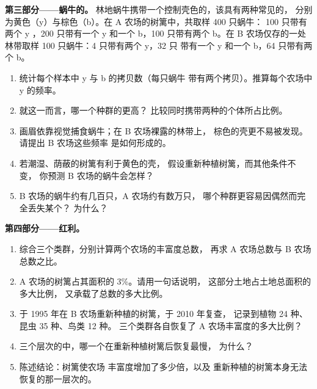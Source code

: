 \begin{problem}
\medskip
\noindent\textbf{第三部分——蜗牛的。}
林地蜗牛携带一个控制壳色的，该具有两种常见的，
分别为黄色（y）与棕色（b）。在 A 农场的树篱中，共取样 400 只蜗牛：
100 只带有两个 y ，200 只带有一个 y 和一个 b，100 只带有两个
b。在 B 农场仅存的一处林带取样 100 只蜗牛：4 只带有两个 y，32 只
带有一个 y 和一个 b，64 只带有两个 b。
\begin{enumerate}[resume]
  \item 统计每个样本中 y 与 b 的拷贝数（每只蜗牛
        带有两个拷贝）。推算每个农场中 y 的频率。
  \item 就这一而言，哪一个种群的更高？
        比较同时携带两种的个体所占比例。
  \item 画眉依靠视觉捕食蜗牛；在 B 农场裸露的林带上，
        棕色的壳更不易被发现。请提出 B 农场这些频率
        是如何形成的。
  \item 若潮湿、荫蔽的树篱有利于黄色的壳，
        假设重新种植树篱，而其他条件不变，
        你预测 B 农场的蜗牛会怎样？
  \item B 农场的蜗牛约有几百只，A 农场约有数万只，
        哪个种群更容易因偶然而完全丢失某个？
        为什么？
\end{enumerate}

\medskip
\noindent\textbf{第四部分——红利。}
\begin{enumerate}[resume]
  \item 综合三个类群，分别计算两个农场的丰富度总数，
        再求 A 农场总数与 B 农场总数之比。
  \item A 农场的树篱占其面积的 3\%。请用一句话说明，
        这部分土地占土地总面积的多大比例，
        又承载了总数的多大比例。
  \item 于 1995 年在 B 农场重新种植的树篱，于 2010 年复查，
        记录到植物 24 种、昆虫 35 种、鸟类 12 种。
        三个类群各自恢复了 A 农场丰富度的多大比例？
  \item 三个层次的中，哪一个在重新种植树篱后恢复最慢，
        为什么？
  \item 陈述结论：树篱使农场
        丰富度增加了多少倍，以及
        重新种植的树篱本身无法恢复的那一层次的。
\end{enumerate}
\end{problem}
